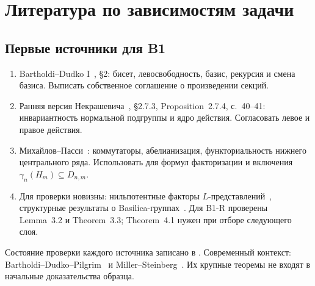 \chapter{Литература по зависимостям задачи}

\section{Первые источники для B1}
\begin{enumerate}
\item Bartholdi--Dudko I~\cite{BDI}, §2: бисет, левосвободность,
      базис, рекурсия и смена базиса. Выписать собственное соглашение
      о произведении секций.
\item Ранняя версия Некрашевича~\cite{NekraBook}, §2.7.3,
      Proposition~2.7.4, с.~40--41: инвариантность нормальной подгруппы
      и ядро действия. Согласовать левое и правое действия.
\item Михайлов--Пасси~\cite{MP}: коммутаторы, абелианизация,
      функториальность нижнего центрального ряда.
      Использовать для формул факторизации и включения
      \(\gamma_n(H_m)\subseteq D_{n,m}\).
\item Для проверки новизны: нильпотентные факторы
      \(L\)-представлений~\cite{NilpotentL}, структурные результаты
      о Basilica-группах~\cite{PBasilica}.
      Для B1-R проверены Lemma~3.2 и Theorem~3.3;
      Theorem~4.1 нужен при отборе следующего слоя.
\end{enumerate}
Состояние проверки каждого источника записано в
. Современный контекст:
Bartholdi--Dudko--Pilgrim~\cite{ModernBisets} и
Miller--Steinberg~\cite{MillerSteinberg}. Их крупные теоремы
не входят в начальные доказательства образца.

